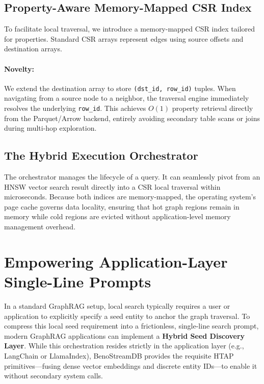 \documentclass[11pt,twocolumn]{article}
\begin{document}
\subsection{Property-Aware Memory-Mapped CSR Index}
To facilitate local traversal, we introduce a memory-mapped CSR index tailored for properties. Standard CSR arrays represent edges using source offsets and destination arrays. 
\paragraph{Novelty:} We extend the destination array to store \texttt{(dst\_id, row\_id)} tuples. When navigating from a source node to a neighbor, the traversal engine immediately resolves the underlying \texttt{row\_id}. This achieves $O(1)$ property retrieval directly from the Parquet/Arrow backend, entirely avoiding secondary table scans or joins during multi-hop exploration.

\subsection{The Hybrid Execution Orchestrator}
The orchestrator manages the lifecycle of a query. It can seamlessly pivot from an HNSW vector search result directly into a CSR local traversal within microseconds. Because both indices are memory-mapped, the operating system's page cache governs data locality, ensuring that hot graph regions remain in memory while cold regions are evicted without application-level memory management overhead.

\section{Empowering Application-Layer Single-Line Prompts}

In a standard GraphRAG setup, local search typically requires a user or application to explicitly specify a seed entity to anchor the graph traversal. To compress this local seed requirement into a frictionless, single-line search prompt, modern GraphRAG applications can implement a \textbf{Hybrid Seed Discovery Layer}. While this orchestration resides strictly in the application layer (e.g., LangChain or LlamaIndex), BenoStreamDB provides the requisite HTAP primitives—fusing dense vector embeddings and discrete entity IDs—to enable it without secondary system calls.
\end{document}
